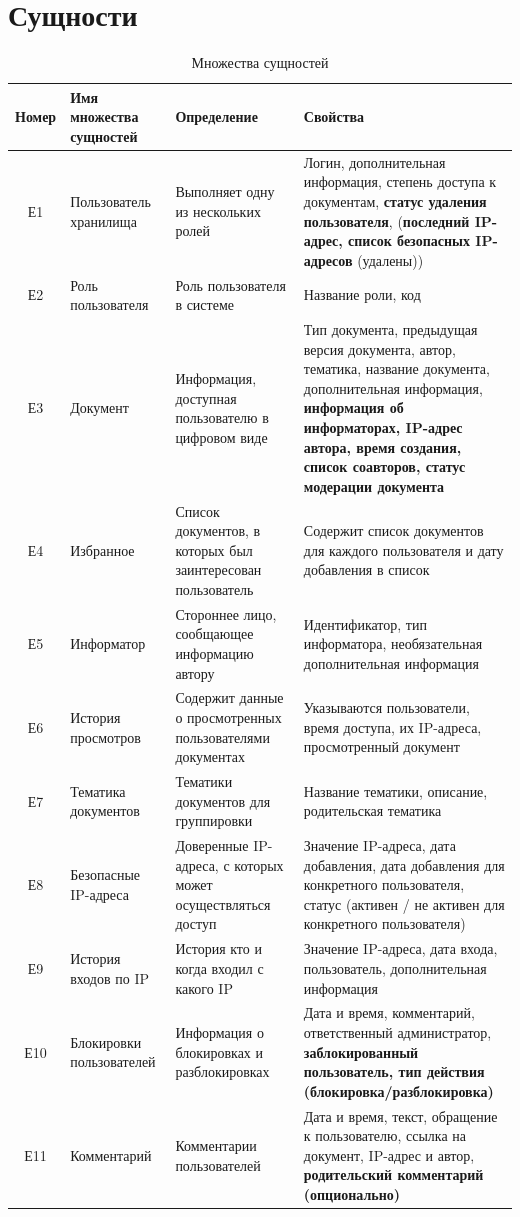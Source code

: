\section{Сущности}

\begin{table}[H]
  \centering
  \begin{tabularx}{\textwidth}{|| c | X | X | X ||}
    \hline
    Номер & Имя множества сущностей & Определение & Свойства \\
    \hline\hline
    Е1 & Пользователь хранилища & Выполняет одну из нескольких ролей 
    & Логин, дополнительная информация, степень доступа к документам, \textbf{статус удаления пользователя}, (\textbf{последний IP-адрес, список безопасных IP-адресов} (удалены)) \\
    \hline
    Е2 & Роль пользователя & Роль пользователя в системе 
    & Название роли, код \\
    \hline
    Е3 & Документ & Информация, доступная пользователю в цифровом виде 
    & Тип документа, предыдущая версия документа, автор, тематика, название документа, дополнительная информация,
    \textbf{информация об информаторах, IP-адрес автора, время создания, список соавторов, статус модерации документа} \\
    \hline
    Е4 & Избранное & Список документов, в которых был заинтересован пользователь 
    & Содержит список документов для каждого пользователя и дату добавления в список \\
    \hline
    Е5 & Информатор & Стороннее лицо, сообщающее информацию автору 
    & Идентификатор, тип информатора, необязательная дополнительная информация \\
    \hline
    Е6 & История просмотров & Содержит данные о просмотренных пользователями документах 
    & Указываются пользователи, время доступа, их IP-адреса, просмотренный документ \\
    \hline
    Е7 & Тематика документов & Тематики документов для группировки 
    & Название тематики, описание, родительская тематика \\
    \hline
    Е8 & Безопасные IP-адреса & Доверенные IP-адреса, с которых может осуществляться доступ 
    & Значение IP-адреса, дата добавления, дата добавления для конкретного пользователя, статус (активен / не активен для конкретного пользователя) \\
    \hline
    Е9 & История входов по IP & История кто и когда входил с какого IP 
    & Значение IP-адреса, дата входа, пользователь, дополнительная информация \\
    \hline
    Е10 & Блокировки пользователей & Информация о блокировках и разблокировках 
    & Дата и время, комментарий, ответственный администратор,
    \textbf{заблокированный пользователь, тип действия (блокировка/разблокировка)} \\
    \hline
    Е11 & Комментарий & Комментарии пользователей 
    & Дата и время, текст, обращение к пользователю, ссылка на документ, IP-адрес и автор,
    \textbf{родительский комментарий (опционально)} \\
    \hline
  \end{tabularx}
  \caption{Множества сущностей}
\end{table}
\restoregeometry